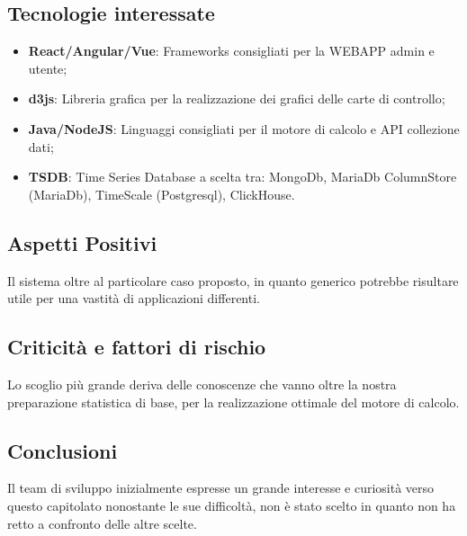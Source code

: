 \subsection{Tecnologie interessate}
	\begin{itemize}
		\item \textbf{React/Angular/Vue}: Frameworks consigliati per la WEBAPP admin e utente;
		\item \textbf{d3js}: Libreria grafica per la realizzazione dei grafici delle carte di controllo;
		\item \textbf{Java/NodeJS}: Linguaggi consigliati per il motore di calcolo e API collezione dati;
		\item \textbf{TSDB}: Time Series Database\glo{} a scelta tra: MongoDb, MariaDb ColumnStore (MariaDb), TimeScale (Postgresql\glo{}), ClickHouse.
	\end{itemize}

\subsection{Aspetti Positivi}
	Il sistema oltre al particolare caso proposto, in quanto generico potrebbe risultare utile per una vastità di applicazioni differenti.

\subsection{Criticità e fattori di rischio}
	Lo scoglio più grande deriva delle conoscenze che vanno oltre la nostra preparazione statistica di base, per la realizzazione ottimale del motore di calcolo.

\subsection{Conclusioni}
	Il team di sviluppo inizialmente espresse un grande interesse e curiosità verso questo capitolato nonostante le sue difficoltà, non è stato scelto in quanto non ha retto a confronto delle altre scelte. 
